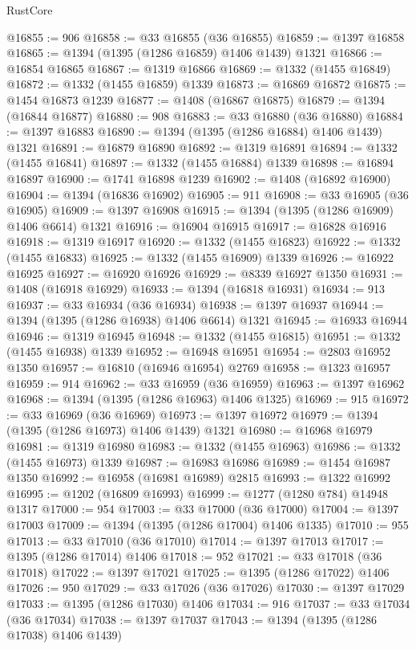 \begin{lexlean}{RustCore}
\begin{coremodule}
@16855 := 906
@16858 := @33 @16855 (@36 @16855)
@16859 := @1397 @16858
@16865 := @1394 (@1395 (@1286 @16859) @1406 @1439) @1321
@16866 := @16854 @16865
@16867 := @1319 @16866
@16869 := @1332 (@1455 @16849)
@16872 := @1332 (@1455 @16859) @1339
@16873 := @16869 @16872
@16875 := @1454 @16873 @1239
@16877 := @1408 (@16867 @16875)
@16879 := @1394 (@16844 @16877)
@16880 := 908
@16883 := @33 @16880 (@36 @16880)
@16884 := @1397 @16883
@16890 := @1394 (@1395 (@1286 @16884) @1406 @1439) @1321
@16891 := @16879 @16890
@16892 := @1319 @16891
@16894 := @1332 (@1455 @16841)
@16897 := @1332 (@1455 @16884) @1339
@16898 := @16894 @16897
@16900 := @1741 @16898 @1239
@16902 := @1408 (@16892 @16900)
@16904 := @1394 (@16836 @16902)
@16905 := 911
@16908 := @33 @16905 (@36 @16905)
@16909 := @1397 @16908
@16915 := @1394 (@1395 (@1286 @16909) @1406 @6614) @1321
@16916 := @16904 @16915
@16917 := @16828 @16916
@16918 := @1319 @16917
@16920 := @1332 (@1455 @16823)
@16922 := @1332 (@1455 @16833)
@16925 := @1332 (@1455 @16909) @1339
@16926 := @16922 @16925
@16927 := @16920 @16926
@16929 := @8339 @16927 @1350
@16931 := @1408 (@16918 @16929)
@16933 := @1394 (@16818 @16931)
@16934 := 913
@16937 := @33 @16934 (@36 @16934)
@16938 := @1397 @16937
@16944 := @1394 (@1395 (@1286 @16938) @1406 @6614) @1321
@16945 := @16933 @16944
@16946 := @1319 @16945
@16948 := @1332 (@1455 @16815)
@16951 := @1332 (@1455 @16938) @1339
@16952 := @16948 @16951
@16954 := @2803 @16952 @1350
@16957 := @16810 (@16946 @16954) @2769
@16958 := @1323 @16957
@16959 := 914
@16962 := @33 @16959 (@36 @16959)
@16963 := @1397 @16962
@16968 := @1394 (@1395 (@1286 @16963) @1406 @1325)
@16969 := 915
@16972 := @33 @16969 (@36 @16969)
@16973 := @1397 @16972
@16979 := @1394 (@1395 (@1286 @16973) @1406 @1439) @1321
@16980 := @16968 @16979
@16981 := @1319 @16980
@16983 := @1332 (@1455 @16963)
@16986 := @1332 (@1455 @16973) @1339
@16987 := @16983 @16986
@16989 := @1454 @16987 @1350
@16992 := @16958 (@16981 @16989) @2815
@16993 := @1322 @16992
@16995 := @1202 (@16809 @16993)
@16999 := @1277 (@1280 @784) @14948 @1317
@17000 := 954
@17003 := @33 @17000 (@36 @17000)
@17004 := @1397 @17003
@17009 := @1394 (@1395 (@1286 @17004) @1406 @1335)
@17010 := 955
@17013 := @33 @17010 (@36 @17010)
@17014 := @1397 @17013
@17017 := @1395 (@1286 @17014) @1406
@17018 := 952
@17021 := @33 @17018 (@36 @17018)
@17022 := @1397 @17021
@17025 := @1395 (@1286 @17022) @1406
@17026 := 950
@17029 := @33 @17026 (@36 @17026)
@17030 := @1397 @17029
@17033 := @1395 (@1286 @17030) @1406
@17034 := 916
@17037 := @33 @17034 (@36 @17034)
@17038 := @1397 @17037
@17043 := @1394 (@1395 (@1286 @17038) @1406 @1439)

\end{coremodule}
\end{lexlean}
